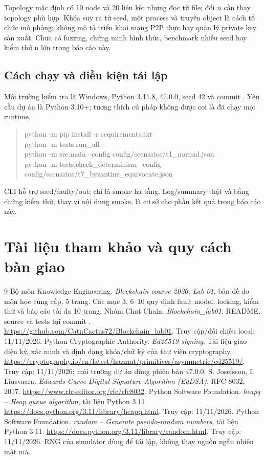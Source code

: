 \documentclass[11pt,a4paper]{article}
\newcommand{\code}[1]{\texttt{\detokenize{#1}}}
\newcommand{\nextpage}{\clearpage}
\begin{document}
Topology mặc định có 10 node và 20 liên kết nhưng đọc từ file; đổi $n$ cần thay topology phù hợp. Khóa suy ra từ seed, một process và truyền object là cách tổ chức mô phỏng; không mô tả triển khai mạng P2P thực hay quản lý private key sản xuất. Chưa có fuzzing, chứng minh hình thức, benchmark nhiều seed hay kiểm thử n lớn trong báo cáo này.

\subsection{Cách chạy và điều kiện tái lập}
Môi trường kiểm tra là Windows, Python 3.11.8, \code{cryptography} 47.0.0, seed 42 và commit \code{add5f32}. Yêu cầu dự án là Python 3.10+; tương thích cú pháp không được coi là đã chạy mọi runtime.

\begin{quote}\small\ttfamily
python -m pip install -r requirements.txt\\
python -m tests.run\_all\\
python -m src.main --config config/scenarios/t1\_normal.json\\
python -m tests.check\_determinism --config config/scenarios/t7\_byzantine\_equivocate.json
\end{quote}
CLI hỗ trợ seed/faulty/out; \code{--smoke-env} chỉ là smoke hạ tầng. Log/summary thật và bằng chứng kiểm thử, thay vì nội dung smoke, là cơ sở cho phần kết quả trong báo cáo này.

\nextpage
\section{Tài liệu tham khảo và quy cách bàn giao}
\begin{thebibliography}{9}
\small
{} Bộ môn Knowledge Engineering. \emph{Blockchain course 2026, Lab 01}, bản đề \code{Lab01.pdf} do môn học cung cấp, 5 trang. Các mục 3, 6--10 quy định fault model, locking, kiểm thử và báo cáo tối đa 10 trang.
 Nhóm Chat Chain. \emph{Blockchain\_lab01}, README, source và tests tại commit \code{add5f32}. \url{https://github.com/CatnCactus72/Blockchain_lab01}. Truy cập/đối chiếu local: 11/11/2026.
 Python Cryptographic Authority. \emph{Ed25519 signing}. Tài liệu giao diện ký, xác minh và định dạng khóa/chữ ký của thư viện cryptography. \url{https://cryptography.io/en/latest/hazmat/primitives/asymmetric/ed25519/}. Truy cập: 11/11/2026; môi trường dự án dùng phiên bản 47.0.0.
 S. Josefsson, I. Liusvaara. \emph{Edwards-Curve Digital Signature Algorithm (EdDSA)}. RFC 8032, 2017. \url{https://www.rfc-editor.org/rfc/rfc8032}.
 Python Software Foundation. \emph{heapq -- Heap queue algorithm}, tài liệu Python 3.11. \url{https://docs.python.org/3.11/library/heapq.html}. Truy cập: 11/11/2026.
 Python Software Foundation. \emph{random -- Generate pseudo-random numbers}, tài liệu Python 3.11. \url{https://docs.python.org/3.11/library/random.html}. Truy cập: 11/11/2026. RNG của simulator dùng để tái lập, không thay nguồn ngẫu nhiên mật mã.
\end{thebibliography}
\end{document}
